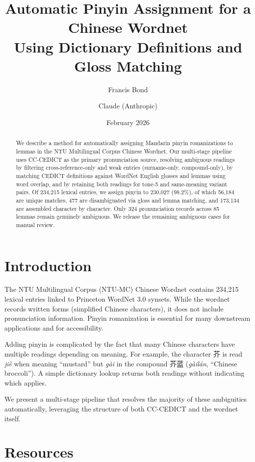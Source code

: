 \documentclass[11pt,a4paper]{article}
\title{Automatic Pinyin Assignment for a Chinese Wordnet\\Using Dictionary Definitions and Gloss Matching}
\author{Francis Bond \and Claude (Anthropic)}
\date{February 2026}
\begin{document}
\maketitle

\begin{abstract}
  We describe a method for automatically assigning Mandarin pinyin
  romanizations to lemmas in the NTU Multilingual Corpus Chinese
  Wordnet.  Our multi-stage pipeline uses CC-CEDICT as the primary
  pronunciation source, resolving ambiguous readings by filtering
  cross-reference-only and weak entries (surname-only, compound-only),
  by matching CEDICT definitions against WordNet English glosses and
  lemmas using word overlap, and by retaining both readings for tone-5
  and same-meaning variant pairs.  Of 234,215 lexical entries, we
  assign pinyin to 230,027 (98.2\%), of which 56,184 are unique
  matches, 477 are disambiguated via gloss and lemma matching, and
  173,134 are assembled character by character.  Only 324
  pronunciation records across 85 lemmas remain genuinely ambiguous.
  We release the remaining ambiguous cases for manual review.
\end{abstract}

\section{Introduction}

The NTU Multilingual Corpus (NTU-MC) Chinese Wordnet contains
234,215 lexical entries linked to Princeton WordNet 3.0 synsets.
While the wordnet records written forms (simplified Chinese
characters), it does not include pronunciation information.  Pinyin
romanization is essential for many downstream applications and for
accessibility.

Adding pinyin is complicated by the fact that many Chinese characters
have multiple readings depending on meaning.  For example, the
character 芥 is read \emph{jiè} when meaning ``mustard'' but
\emph{gài} in the compound 芥蓝 (\emph{gàilán}, ``Chinese
broccoli'').  A simple dictionary lookup returns both readings without
indicating which applies.

We present a multi-stage pipeline that resolves the majority of these
ambiguities automatically, leveraging the structure of both CC-CEDICT
and the wordnet itself.

\section{Resources}
\end{document}
